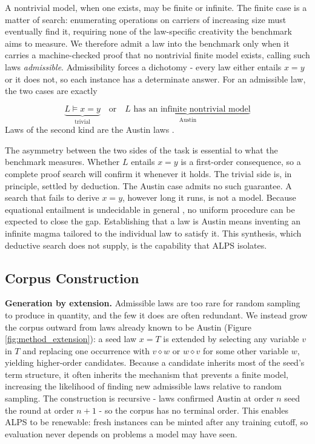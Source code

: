 \documentclass[letterpaper]{article} %
\newcommand{\op}{\diamond}
\begin{document}
A nontrivial model, when one exists, may be finite or infinite. The finite case is a matter of search: enumerating operations on carriers of increasing size must eventually find it, requiring none of the law-specific creativity the benchmark aims to measure. We therefore admit a law into the benchmark only when it carries a machine-checked proof that no nontrivial finite model exists, calling such laws \textit{admissible}. Admissibility forces a dichotomy - every law either entails $x=y$ or it does not, so each instance has a determinate answer. For an admissible law, the two cases are exactly

\begin{equation}
    \label{eq:dichotomy}
    \underbrace{L \models x = y}_{\text{trivial}}
    \quad\text{or}\quad
    \underbrace{L \text{ has an infinite nontrivial model}}_{\text{Austin}}
\end{equation}
Laws of the second kind are the Austin laws \citep{kisielewicz1997austin}.

The asymmetry between the two sides of the task is essential to what the benchmark measures. Whether $L$ entails $x = y$ is a first-order consequence, so a complete proof search will confirm it whenever it holds. The trivial side is, in principle, settled by deduction. The Austin case admits no such guarantee. A search that fails to derive $x = y$, however long it runs, is not a model. Because equational entailment is undecidable in general \citep{baader1998term}, no uniform procedure can be expected to close the gap. Establishing that a law is Austin means inventing an infinite magma tailored to the individual law to satisfy it. This synthesis, which deductive search does not supply, is the capability that ALPS isolates. 





\subsection{Corpus Construction}
\textbf{Generation by extension.} Admissible laws are too rare for random sampling to produce in quantity, and the few it does are often redundant. We instead grow the corpus outward from laws already known to be Austin (Figure \ref{fig:method_extension}): a seed law $x = T$ is extended by selecting any variable $v$ in $T$ and replacing one occurrence with $v \op w$ or $w \op v$ for some other variable $w$, yielding higher-order candidates. Because a candidate inherits most of the seed's term structure, it often inherits the mechanism that prevents a finite model, increasing the likelihood of finding new admissible laws relative to random sampling. The construction is recursive - laws confirmed Austin at order $n$ seed the round at order $n+1$ - so the corpus has no terminal order. This enables ALPS to be renewable: fresh instances can be minted after any training cutoff, so evaluation never depends on problems a model may have seen.  
\end{document}
